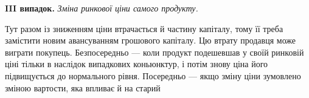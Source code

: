 \textbf{III випадок.} \emph{Зміна ринкової ціни самого продукту.}

Тут разом із зниженням ціни втрачається й частину капіталу, тому її
треба замістити новим авансуванням грошового капіталу. Цю втрату
продавця може виграти покупець. Безпосередньо — коли продукт подешевшав
у своїй ринковій ціні тільки в наслідок випадкових коньюнктур,
і потім знову ціна його підвищується до нормального рівня. Посередньо —
якщо зміну ціни зумовлено зміною вартости, яка впливає й на старий
\parbreak{}  %
